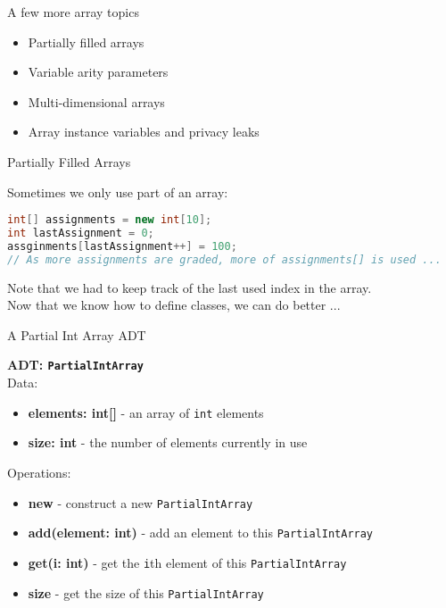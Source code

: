 \documentclass{beamer}
\author[Chris Simpkins] 
{Christopher Simpkins \\\texttt{chris.simpkins@gatech.edu}}
\institute[Georgia Tech] %
\date[CS 1331]{}
\begin{document}
\begin{frame}
  \titlepage
\end{frame}

\begin{frame}[fragile]{A few more array topics}


\begin{itemize}
\item Partially filled arrays
\item Variable arity parameters
\item Multi-dimensional arrays
\item Array instance variables and privacy leaks
\end{itemize}


\end{frame}


\begin{frame}[fragile]{Partially Filled Arrays}


Sometimes we only use part of an array:
\begin{lstlisting}[language=Java]
int[] assignments = new int[10];
int lastAssignment = 0;
assginments[lastAssignment++] = 100;
// As more assignments are graded, more of assignments[] is used ...
\end{lstlisting}
Note that we had to keep track of the last used index in the array.\\
\vspace{.1in}
Now that we know how to define classes, we can do better ...

\end{frame}

\begin{frame}[fragile]{A Partial Int Array ADT}

{\bf ADT: {\tt PartialIntArray}}\\
Data:
\begin{itemize}
\item {\bf elements: int[]} - an array of {\tt int} elements
\item {\bf size: int} - the number of elements currently in use
\end{itemize}
Operations:
\begin{itemize}
\item {\bf new} - construct a new {\tt PartialIntArray}
\item {\bf add(element: int)} - add an element to this {\tt PartialIntArray}
\item {\bf get(i: int)} - get the {\tt i}th element of this {\tt PartialIntArray}
\item {\bf size} - get the size of this {\tt PartialIntArray}
\end{itemize}

\end{frame}
\end{document}
